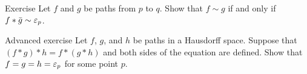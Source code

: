\begin{thm}{Exercise}
Let $f$ and $g$ be paths from $p$ to $q$.
Show that $f\sim g$ if and only if $f*\bar g\sim \varepsilon_p$.
\end{thm}


\begin{thm}{Advanced exercise}\label{ex:assoc}
Let $f$, $g$, and $h$ be paths in a Hausdorff space.
Suppose that $(f*g)*h= f*(g*h)$
and both sides of the equation are defined.
Show that $f=g=h=\varepsilon_p$ for some point $p$.
\end{thm}
